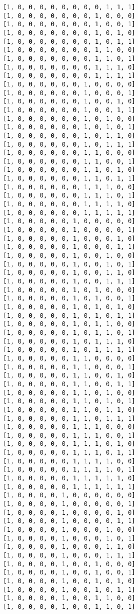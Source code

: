 \documentclass[11pt]{article}
\begin{document}
\begin{Verbatim}[commandchars=\\\{\}]
[1, 0, 0, 0, 0, 0, 0, 0, 0, 1, 1, 1]
[1, 0, 0, 0, 0, 0, 0, 0, 1, 0, 0, 0]
[1, 0, 0, 0, 0, 0, 0, 0, 1, 0, 0, 1]
[1, 0, 0, 0, 0, 0, 0, 0, 1, 0, 1, 0]
[1, 0, 0, 0, 0, 0, 0, 0, 1, 0, 1, 1]
[1, 0, 0, 0, 0, 0, 0, 0, 1, 1, 0, 0]
[1, 0, 0, 0, 0, 0, 0, 0, 1, 1, 0, 1]
[1, 0, 0, 0, 0, 0, 0, 0, 1, 1, 1, 0]
[1, 0, 0, 0, 0, 0, 0, 0, 1, 1, 1, 1]
[1, 0, 0, 0, 0, 0, 0, 1, 0, 0, 0, 0]
[1, 0, 0, 0, 0, 0, 0, 1, 0, 0, 0, 1]
[1, 0, 0, 0, 0, 0, 0, 1, 0, 0, 1, 0]
[1, 0, 0, 0, 0, 0, 0, 1, 0, 0, 1, 1]
[1, 0, 0, 0, 0, 0, 0, 1, 0, 1, 0, 0]
[1, 0, 0, 0, 0, 0, 0, 1, 0, 1, 0, 1]
[1, 0, 0, 0, 0, 0, 0, 1, 0, 1, 1, 0]
[1, 0, 0, 0, 0, 0, 0, 1, 0, 1, 1, 1]
[1, 0, 0, 0, 0, 0, 0, 1, 1, 0, 0, 0]
[1, 0, 0, 0, 0, 0, 0, 1, 1, 0, 0, 1]
[1, 0, 0, 0, 0, 0, 0, 1, 1, 0, 1, 0]
[1, 0, 0, 0, 0, 0, 0, 1, 1, 0, 1, 1]
[1, 0, 0, 0, 0, 0, 0, 1, 1, 1, 0, 0]
[1, 0, 0, 0, 0, 0, 0, 1, 1, 1, 0, 1]
[1, 0, 0, 0, 0, 0, 0, 1, 1, 1, 1, 0]
[1, 0, 0, 0, 0, 0, 0, 1, 1, 1, 1, 1]
[1, 0, 0, 0, 0, 0, 1, 0, 0, 0, 0, 0]
[1, 0, 0, 0, 0, 0, 1, 0, 0, 0, 0, 1]
[1, 0, 0, 0, 0, 0, 1, 0, 0, 0, 1, 0]
[1, 0, 0, 0, 0, 0, 1, 0, 0, 0, 1, 1]
[1, 0, 0, 0, 0, 0, 1, 0, 0, 1, 0, 0]
[1, 0, 0, 0, 0, 0, 1, 0, 0, 1, 0, 1]
[1, 0, 0, 0, 0, 0, 1, 0, 0, 1, 1, 0]
[1, 0, 0, 0, 0, 0, 1, 0, 0, 1, 1, 1]
[1, 0, 0, 0, 0, 0, 1, 0, 1, 0, 0, 0]
[1, 0, 0, 0, 0, 0, 1, 0, 1, 0, 0, 1]
[1, 0, 0, 0, 0, 0, 1, 0, 1, 0, 1, 0]
[1, 0, 0, 0, 0, 0, 1, 0, 1, 0, 1, 1]
[1, 0, 0, 0, 0, 0, 1, 0, 1, 1, 0, 0]
[1, 0, 0, 0, 0, 0, 1, 0, 1, 1, 0, 1]
[1, 0, 0, 0, 0, 0, 1, 0, 1, 1, 1, 0]
[1, 0, 0, 0, 0, 0, 1, 0, 1, 1, 1, 1]
[1, 0, 0, 0, 0, 0, 1, 1, 0, 0, 0, 0]
[1, 0, 0, 0, 0, 0, 1, 1, 0, 0, 0, 1]
[1, 0, 0, 0, 0, 0, 1, 1, 0, 0, 1, 0]
[1, 0, 0, 0, 0, 0, 1, 1, 0, 0, 1, 1]
[1, 0, 0, 0, 0, 0, 1, 1, 0, 1, 0, 0]
[1, 0, 0, 0, 0, 0, 1, 1, 0, 1, 0, 1]
[1, 0, 0, 0, 0, 0, 1, 1, 0, 1, 1, 0]
[1, 0, 0, 0, 0, 0, 1, 1, 0, 1, 1, 1]
[1, 0, 0, 0, 0, 0, 1, 1, 1, 0, 0, 0]
[1, 0, 0, 0, 0, 0, 1, 1, 1, 0, 0, 1]
[1, 0, 0, 0, 0, 0, 1, 1, 1, 0, 1, 0]
[1, 0, 0, 0, 0, 0, 1, 1, 1, 0, 1, 1]
[1, 0, 0, 0, 0, 0, 1, 1, 1, 1, 0, 0]
[1, 0, 0, 0, 0, 0, 1, 1, 1, 1, 0, 1]
[1, 0, 0, 0, 0, 0, 1, 1, 1, 1, 1, 0]
[1, 0, 0, 0, 0, 0, 1, 1, 1, 1, 1, 1]
[1, 0, 0, 0, 0, 1, 0, 0, 0, 0, 0, 0]
[1, 0, 0, 0, 0, 1, 0, 0, 0, 0, 0, 1]
[1, 0, 0, 0, 0, 1, 0, 0, 0, 0, 1, 0]
[1, 0, 0, 0, 0, 1, 0, 0, 0, 0, 1, 1]
[1, 0, 0, 0, 0, 1, 0, 0, 0, 1, 0, 0]
[1, 0, 0, 0, 0, 1, 0, 0, 0, 1, 0, 1]
[1, 0, 0, 0, 0, 1, 0, 0, 0, 1, 1, 0]
[1, 0, 0, 0, 0, 1, 0, 0, 0, 1, 1, 1]
[1, 0, 0, 0, 0, 1, 0, 0, 1, 0, 0, 0]
[1, 0, 0, 0, 0, 1, 0, 0, 1, 0, 0, 1]
[1, 0, 0, 0, 0, 1, 0, 0, 1, 0, 1, 0]
[1, 0, 0, 0, 0, 1, 0, 0, 1, 0, 1, 1]
[1, 0, 0, 0, 0, 1, 0, 0, 1, 1, 0, 0]
[1, 0, 0, 0, 0, 1, 0, 0, 1, 1, 0, 1]

\end{Verbatim}
\end{document}
